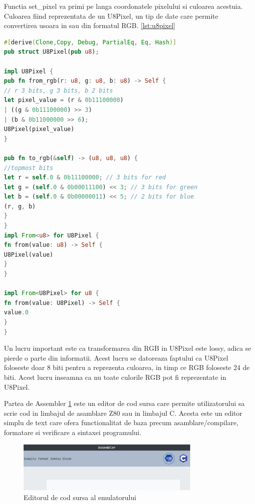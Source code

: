 \documentclass[titlepage,12pt]{article}
\DeclareRobustCommand{\code}[1]{{\ttfamily\small #1}}
\begin{document}
Functia \code{set\_pixel} va primi pe langa coordonatele pixelului si culoarea acestuia. Culoarea fiind reprezentata de un \code{U8Pixel}, un tip de date care permite convertirea usoara in sau din formatul RGB. \cref{lst:u8pixel}

\begin{lstlisting}[language=Rust,caption={Tipul de date U8Pixel},label={lst:u8pixel}]
#[derive(Clone,Copy, Debug, PartialEq, Eq, Hash)]
pub struct U8Pixel(pub u8);

impl U8Pixel {
pub fn from_rgb(r: u8, g: u8, b: u8) -> Self {
// r 3 bits, g 3 bits, b 2 bits
let pixel_value = (r & 0b11100000)
| ((g & 0b11100000) >> 3)
| (b & 0b11000000 >> 6);
U8Pixel(pixel_value)
}

pub fn to_rgb(&self) -> (u8, u8, u8) {
//topmost bits
let r = self.0 & 0b11100000; // 3 bits for red
let g = (self.0 & 0b00011100) << 3; // 3 bits for green
let b = (self.0 & 0b00000011) << 5; // 2 bits for blue
(r, g, b)
}
}
impl From<u8> for U8Pixel {
fn from(value: u8) -> Self {
U8Pixel(value)
}
}

impl From<U8Pixel> for u8 {
fn from(value: U8Pixel) -> Self {
value.0
}
}
\end{lstlisting}

Un lucru important este ca transformarea din RGB in U8Pixel este \code{lossy}, adica se pierde o parte din informatii. Acest lucru se datoreaza faptului ca U8Pixel foloseste doar 8 biti pentru a reprezenta culoarea, in timp ce RGB foloseste 24 de biti. Acest lucru inseamna ca nu toate culorile RGB pot fi reprezentate in U8Pixel.

Partea de \code{Assembler} \cref{fig:assembler} este un editor de cod sursa care permite utilizatorului sa scrie cod in limbajul de asamblare Z80 sau in limbajul C. Acesta este un editor simplu de text care ofera functionalitat de baza precum asamblare/compilare, formatare si verificare a sintaxei programului.

\begin{figure}[H]
\centering
\includegraphics[width=0.8\textwidth]{images/assembler.png}
\caption{Editorul de cod sursa al emulatorului}
\label{fig:assembler}
\end{figure}
\end{document}
